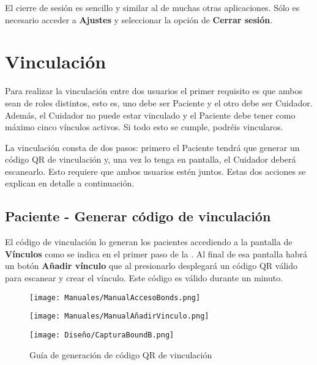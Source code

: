 El cierre de sesión es sencillo y similar al de muchas otras aplicaciones. Sólo es necesario acceder a \textbf{Ajustes} y seleccionar la opción de \textbf{Cerrar sesión}.

\section{Vinculación}

Para realizar la vinculación entre dos usuarios el primer requisito es que ambos sean de roles distintos, esto es, uno debe ser Paciente y el otro debe ser Cuidador. Además, el Cuidador no puede estar vinculado y el Paciente debe tener como máximo cinco vínculos activos. Si todo esto se cumple, podréis vincularos.

La vinculación consta de dos pasos: primero el Paciente tendrá que generar un código QR de vinculación y, una vez lo tenga en pantalla, el Cuidador deberá escanearlo. Esto requiere que ambos usuarios estén juntos. Estas dos acciones se explican en detalle a continuación.

\subsection{Paciente - Generar código de vinculación}

El código de vinculación lo generan los pacientes accediendo a la pantalla de \textbf{Vínculos} como se indica en el primer paso de la . Al final de esa pantalla habrá un botón \textbf{Añadir vínculo} que al presionarlo desplegará un código QR válido para escanear y crear el vínculo. Este código es válido durante un minuto.

\begin{figure}[H]
    \centering
    \begin{minipage}{0.30\textwidth}
        \centering
        \texttt{[image: Manuales/ManualAccesoBonds.png]}
    \end{minipage}\hfill
    \begin{minipage}{0.30\textwidth}
        \centering
        \texttt{[image: Manuales/ManualAñadirVinculo.png]}
    \end{minipage}\hfill
    \begin{minipage}{0.30\textwidth}
        \centering
        \texttt{[image: Diseño/CapturaBoundB.png]}
    \end{minipage}\hfill
    \caption{Guía de generación de código QR de vinculación}
    \label{man:generar_qr}
\end{figure}

